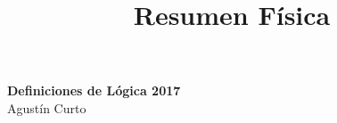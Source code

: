 \documentclass[12pt,a4paper]{article}
\title{Resumen Física}
\begin{document}
	\begin{center}
		\Huge \textbf{Definiciones de Lógica 2017} \\
		\vspace{3mm}
		\large Agustín Curto
	\end{center}
	
	
	
	
	
	
\end{document}

